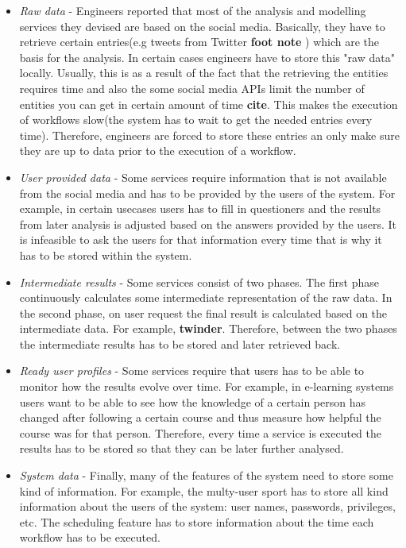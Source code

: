 \begin{itemize}

	\item \textit{Raw data} - Engineers reported that most of the analysis and modelling services they devised are based on the social media. Basically, they have to retrieve certain entries(e.g tweets from Twitter \textbf{foot note} ) which are the basis for the analysis. In certain cases engineers have to store this "raw data" locally. Usually, this is as a result of the fact that the retrieving the entities requires time and also the some social media APIs limit the number of entities you can get in certain amount of time \textbf{cite}. This makes the execution of workflows slow(the system has to wait to get the needed entries every time). Therefore, engineers are forced to store these entries an only make sure they are up to data prior to the execution of a workflow.
	
	\item \textit{User provided data} - Some services require information that is not available from the social media and has to be provided by the users of the system. For example, in certain usecases users has to fill in questioners and the results from later analysis is adjusted based on the answers provided by the users. It is infeasible to ask the users for that information every time that is why it has to be stored within the system.
	
	\item \textit{Intermediate results} - Some services consist of two phases. The first phase continuously calculates some intermediate representation of the raw data. In the second phase, on user request the final result is calculated based on the intermediate data. For example, \textbf{twinder}. Therefore, between the two phases the intermediate results has to be stored and later retrieved back.
	
	\item \textit{Ready user profiles} - Some services require that users has to be able to monitor how the results evolve over time. For example, in e-learning systems users want to be able to see how the knowledge of a certain person has changed after following a certain course and thus measure how helpful the course was for that person. Therefore, every time a service is executed the results has to be stored so that they can be later further analysed.
	
	\item \textit{System data} - Finally, many of the features of the system need to store some kind of information. For example, the multy-user sport has to store all kind information about the users of the system: user names, passwords, privileges, etc. The scheduling feature has to store information about the time each workflow has to be executed. 
	
\end{itemize}

